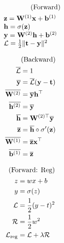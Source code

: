 \documentclass[4pt]{article}
\begin{document}
	\begin{minipage}[t]{.15\linewidth}
		\begin{align*}
			\text{{(Forward)}} \\
			\begin{array}{l}{\mathbf{z}=\mathbf{W}^{(1)} \mathbf{x}+\mathbf{b}^{(1)}} \\ {\mathbf{h}=\sigma(\mathbf{z})} \\ {\mathbf{y}=\mathbf{W}^{(2)} \mathbf{h}+\mathbf{b}^{(2)}} \\ {\mathcal{L}=\frac{1}{2}\|\mathbf{t}-\mathbf{y}\|^{2}}\end{array}
		\end{align*}
	\end{minipage}
	\begin{minipage}[t]{.15\linewidth}
		\begin{align*}
			\text{{(Backward)}} \\
			\begin{aligned} \overline{\mathcal{L}} &=1 \\ \overline{\mathbf{y}} &=\overline{\mathcal{L}}(\mathbf{y}-\mathbf{t}) \\ \overline{\mathbf{W}^{(2)}} &=\overline{\mathbf{y}} \mathbf{h}^{\top} \\ \overline{\mathbf{h}^{(2)}} &=\overline{\mathbf{y}} \\ \overline{\mathbf{h}} &=\mathbf{W}^{(2) \top} \overline{\mathbf{y}} \\ \overline{\mathbf{z}} &=\overline{\mathbf{h}} \circ \sigma^{\prime}(\mathbf{z}) \\ \overline{\mathbf{W}^{(1)}} &=\overline{\mathbf{z}} \mathbf{x}^{\top} \\ \overline{\mathbf{b}^{(1)}} &=\overline{\mathbf{z}} \end{aligned}
		\end{align*}
	\end{minipage}
	\vline
	\begin{minipage}[t]{.15\linewidth}
	  	\begin{align*}
	  		\text{{(Forward: Reg)}} \\
			\begin{aligned} z &=w x+b \\ y &=\sigma(z) \\ \mathcal{L} &=\frac{1}{2}(y-t)^{2} \\ \mathcal{R} &=\frac{1}{2} w^{2} \\ \mathcal{L}_{\mathrm{reg}} &=\mathcal{L}+\lambda \mathcal{R} \end{aligned}
		\end{align*}
	\end{minipage}
\end{document}
